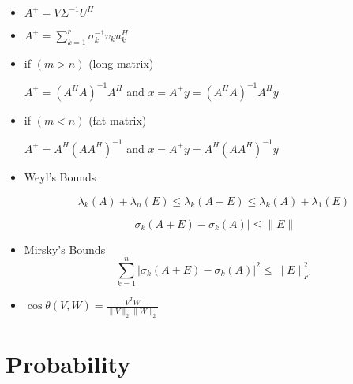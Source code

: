 \documentclass{article}
\begin{document}
\begin{itemize}
\item 
   $
    A^+ = V \Sigma^{-1} U^H
   $


\item 
$
A^+ = \sum_{k=1}^{r} \sigma_k^{-1} v_k u_k^H
$


\item if $(m > n)$ (long matrix)

    $
    A^+ = (A^H A)^{-1} A^H
    $ and $x = A^+y = (A^H A)^{-1} A^Hy$

\item if $(m < n)$ (fat matrix)

$
 A^+ = A^H(AA^H)^{-1}
$ and $x = A^+y = A^H(AA^H)^{-1}y$

\item Weyl's Bounds

\[
\lambda_k(A) + \lambda_n(E) \leq \lambda_k(A + E) \leq \lambda_k(A) + \lambda_1(E)
\]

\[
\lvert \sigma_k(A + E) - \sigma_k(A) \rvert \leq \lVert E \rVert
\]


\item Mirsky's Bounds
\[
\sum_{k=1}^{n} \lvert \sigma_k(A + E) - \sigma_k(A) \rvert^2 \leq \lVert E \rVert_F^2
\]

\item   $
    \cos \theta(V,W) = \frac{V^T W}{\lVert V \rVert_2 \lVert W \rVert_2}
    $

\end{itemize}


\section{Probability}
\end{document}
